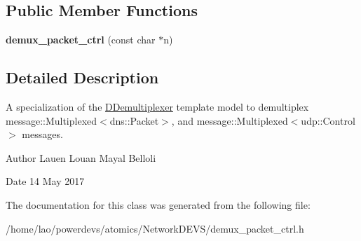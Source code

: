 \subsection*{Public Member Functions}
\begin{DoxyCompactItemize}
\item 
{\bfseries demux\+\_\+packet\+\_\+ctrl} (const char $\ast$n)\hypertarget{classdemux__packet__ctrl_a549fcf28629db3cf4f1726d693a645e2}{}\label{classdemux__packet__ctrl_a549fcf28629db3cf4f1726d693a645e2}

\end{DoxyCompactItemize}


\subsection{Detailed Description}
A specialization of the \hyperlink{classDDemultiplexer}{D\+Demultiplexer} template model to demultiplex message\+::\+Multiplexed$<$dns\+::\+Packet$>$, and message\+::\+Multiplexed$<$udp\+::\+Control$>$ messages. 

\begin{DoxyAuthor}{Author}
Lauen Louan Mayal Belloli 
\end{DoxyAuthor}
\begin{DoxyDate}{Date}
14 May 2017 
\end{DoxyDate}


The documentation for this class was generated from the following file\+:\begin{DoxyCompactItemize}
\item 
/home/lao/powerdevs/atomics/\+Network\+D\+E\+V\+S/demux\+\_\+packet\+\_\+ctrl.\+h\end{DoxyCompactItemize}
